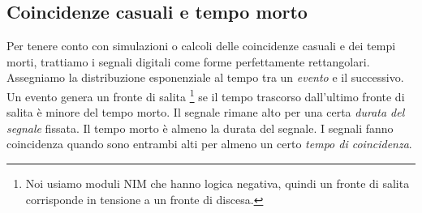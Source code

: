 \subsection{Coincidenze casuali e tempo morto}

Per tenere conto con simulazioni o calcoli delle coincidenze casuali e dei tempi morti,
trattiamo i segnali digitali come forme perfettamente rettangolari.
Assegniamo la distribuzione esponenziale al tempo tra un \emph{evento} e il successivo.
Un evento genera un fronte di salita%
\footnote{Noi usiamo moduli NIM che hanno logica negativa, quindi un fronte di salita corrisponde in tensione a un fronte di discesa.}
se il tempo trascorso dall'ultimo fronte di salita
è minore del tempo morto.
Il segnale rimane alto per una certa \emph{durata del segnale} fissata.
Il tempo morto è almeno la durata del segnale.
I segnali fanno coincidenza quando sono entrambi alti per almeno un certo \emph{tempo di coincidenza}.
